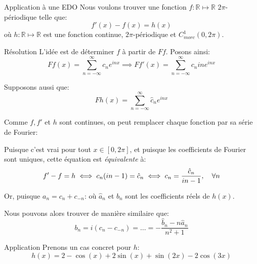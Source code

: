 \documentclass[a4paper]{article}
\begin{document}
\begin{parag}{Application à une EDO}
    Nous voulons trouver une fonction $f: \mathbb{R} \mapsto \mathbb{R}$ $2\pi$-périodique telle que: 
    \[f'\left(x\right) - f\left(x\right) = h\left(x\right)\]
    où $h: \mathbb{R} \mapsto \mathbb{R}$ est une fonction continue, $2\pi$-périodique et $C_{morc}^1\left(0, 2\pi\right)$.
    
    \begin{subparag}{Résolution}
        L'idée est de déterminer $f$ à partir de $F f$. Posons ainsi: 
        \[F f\left(x\right) = \sum_{n=-\infty}^{\infty} c_n e^{inx} \implies F f'\left(x\right) = \sum_{n=-\infty}^{\infty} c_n in e^{inx}\]
        
        Supposons aussi que: 
        \[F h\left(x\right) = \sum_{n=-\infty}^{\infty} \hat{c}_n e^{inx}\]
        
        Comme $f, f'$ et $h$ sont continues, on peut remplacer chaque fonction par sa série de Fourier: 
        
        Puisque c'est vrai pour tout $x \in \left[0, 2\pi\right]$, et puisque les coefficients de Fourier sont uniques, cette équation est \textit{équivalente} à:  
        \[f' - f = h \iff c_n\left(in - 1\right) = \hat{c}_n \iff c_n = \frac{\hat{c}_n}{in - 1}, \mathspace \forall n\]

        Or, puisque $a_n = c_n + c_{-n}$: 
        où $\hat{a}_n$ et $\hat{b}_n$ sont les coefficients réels de $h\left(x\right)$.

        Nous pouvons alors trouver de manière similaire que: 
        \[b_n = i\left(c_n - c_{-n}\right) = \ldots = - \frac{\hat{b}_n - n \hat{a}_n}{n^2+ 1}\]
        
    \end{subparag}
    
    \begin{subparag}{Application}
        Prenons un cas concret pour $h$: 
        \[h\left(x\right) = 2 - \cos\left(x\right) + 2\sin\left(x\right) + \sin\left(2x\right) - 2 \cos\left(3x\right)\]
        

\end{subparag}
\end{parag}
\end{document}
